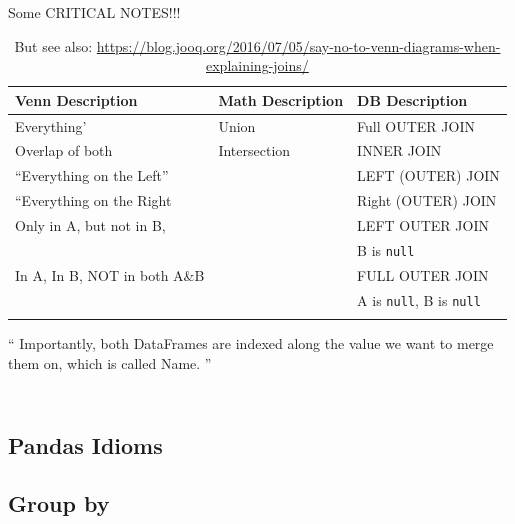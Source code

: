 \documentclass[11pt]{article}
\begin{document}
    Some CRITICAL NOTES!!! \\
    \begin{table}
      \begin{center}
        \begin{tabular}{l l l}
          \hline              \hline
          Venn Description  & Math Description  & DB Description \\
          \hline
          Everything' & Union & Full OUTER JOIN \\
          Overlap of both  & Intersection & INNER JOIN \\
          ``Everything on the Left'' & &   LEFT (OUTER) JOIN \\
          ``Everything on the Right & &   Right (OUTER) JOIN \\
          Only in A, but not in  B, & & LEFT OUTER JOIN \\
                                                & & B is {\tt null}\\
          In A, In B, NOT in both A\&B & & FULL OUTER JOIN \\
                                                        & & A is  {\tt null}, B is {\tt null}\\
          \hline             \hline
          \label{tab:The_LRG_numbers}
        \end{tabular}
        \caption{But see also: \href{https://blog.jooq.org/2016/07/05/say-no-to-venn-diagrams-when-explaining-joins/}{https://blog.jooq.org/2016/07/05/say-no-to-venn-diagrams-when-explaining-joins/}}
      \end{center}
    \end{table}

    `` Importantly, both DataFrames are indexed along the value we want to merge them on, which is called Name. ''
          
    \begin{lstlisting}

    \end{lstlisting}

    \begin{lstlisting}
    \end{lstlisting}



    \subsection{Pandas Idioms}
    \subsection{Group by}
\end{document}
